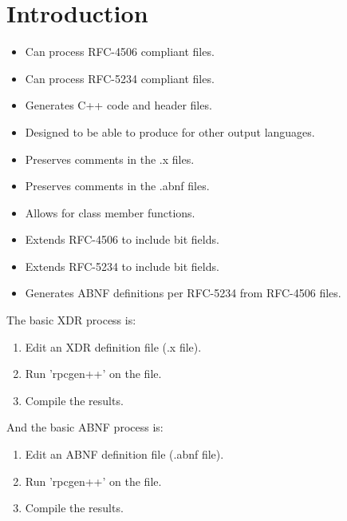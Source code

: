 \section{Introduction}
\begin{itemize}
\item Can process RFC-4506 compliant files.
\item Can process RFC-5234 compliant files.
\item Generates C++ code and header files.
\item Designed to be able to produce for other output languages.
\item Preserves comments in the .x files.
\item Preserves comments in the .abnf files.
\item Allows for class member functions.
\item Extends RFC-4506 to include bit fields.
\item Extends RFC-5234 to include bit fields.
\item Generates ABNF definitions per RFC-5234 from RFC-4506 files.
\end{itemize}

The basic XDR process is:
\begin{enumerate}
\item Edit an XDR definition file (.x file).
\item Run 'rpcgen++' on the file.
\item Compile the results.
\end{enumerate}

And the basic ABNF process is:
\begin{enumerate}
\item Edit an ABNF definition file (.abnf file).
\item Run 'rpcgen++' on the file.
\item Compile the results.
\end{enumerate}
